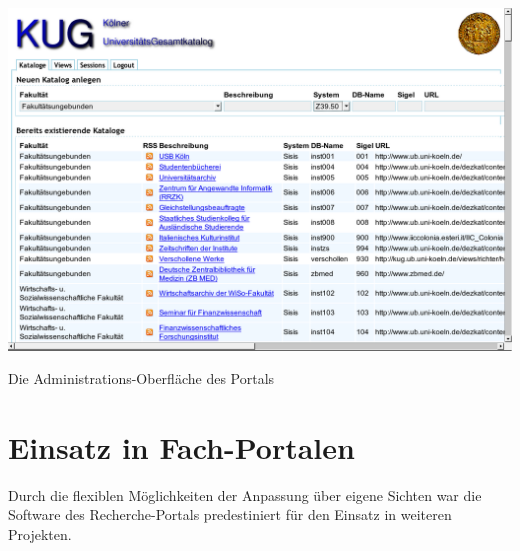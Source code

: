 \documentclass[11pt]{scrartcl}
\begin{document}
\begin{shadowenv}
  \vspace{4mm}
    \centering \begin{minipage}[b]{1.0\textwidth}
      \centering \includegraphics[width=15cm]{openbib-bfp-2007_bilder/Abb-02-administration.png}
    \end{minipage}
    \caption{Die Administrations-Oberfläche des Portals}
  \label{bild:admin}
  \vspace{3mm}
\end{shadowenv}

\section{Einsatz in Fach-Portalen}
Durch die flexiblen Möglichkeiten der Anpassung über eigene Sichten
war die Software des Recherche-Portals predestiniert für den Einsatz
in weiteren Projekten.
 
\end{document}
